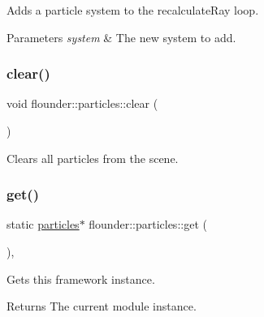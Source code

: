 Adds a particle system to the recalculate\+Ray loop. 


\begin{DoxyParams}{Parameters}
{\em system} & The new system to add. \\
\hline
\end{DoxyParams}
\mbox{\label{classflounder_1_1particles_aba5f1d3ae0abf22fbc73463075e4777f}} 
\subsubsection{\texorpdfstring{clear()}{clear()}}
{\footnotesize\ttfamily void flounder\+::particles\+::clear (\begin{DoxyParamCaption}{ }\end{DoxyParamCaption})}



Clears all particles from the scene. 

\mbox{\label{classflounder_1_1particles_aa1e98a0a6bf664a5ef5e8a637f5bc195}} 
\subsubsection{\texorpdfstring{get()}{get()}}
{\footnotesize\ttfamily static \hyperlink{classflounder_1_1particles}{particles}$\ast$ flounder\+::particles\+::get (\begin{DoxyParamCaption}{ }\end{DoxyParamCaption})\hspace{0.3cm}{\ttfamily [inline]}, {\ttfamily [static]}}



Gets this framework instance. 

\begin{DoxyReturn}{Returns}
The current module instance. 
\end{DoxyReturn}
\mbox{\label{classflounder_1_1particles_a6a78873c57f68dd35a464156cea4b05b}} 
